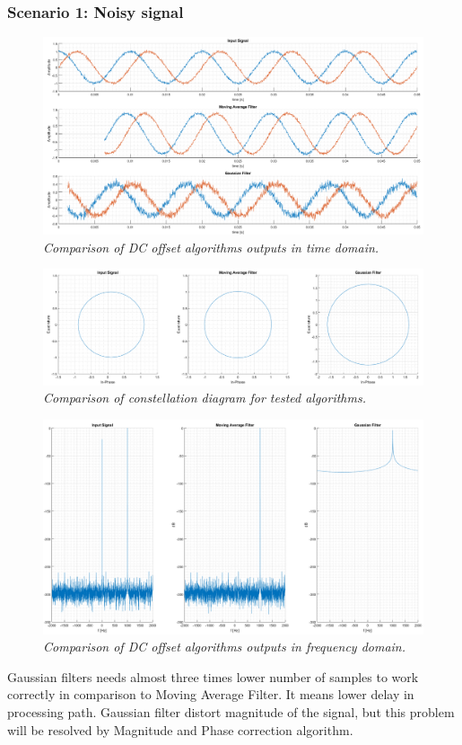 \documentclass[en,printmode]{mgr}
\begin{document}
		\subsubsection*{Scenario 1: Noisy signal}
		\begin{figure}[H]
    			\centering
   				\includegraphics[width=\textwidth]{plots/dc_comp_n.png}
   		 		\caption{\textit{Comparison of DC offset algorithms outputs in time domain.}}
		\end{figure}		
		\begin{figure}[H]
    			\centering
   				\includegraphics[width=\textwidth]{plots/dc_c.png}
   		 \caption{\textit{Comparison of constellation diagram for tested algorithms.}}
		\end{figure}
		\begin{figure}[H]
    			\centering
   				\includegraphics[width=\textwidth]{plots/dc_f.png}
   		 		\caption{\textit{Comparison of DC offset algorithms outputs in frequency domain.}}
		\end{figure}
		Gaussian filters needs almost three times lower number of samples to work correctly in
		comparison to Moving Average Filter. It means lower delay in processing path. Gaussian
		filter distort magnitude of the signal, but this problem will be resolved by Magnitude and
		Phase correction algorithm.
	\newpage
\end{document}
